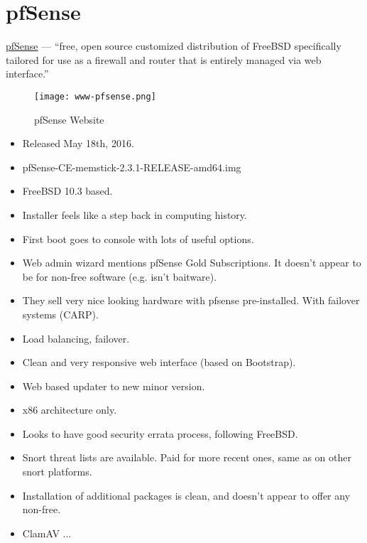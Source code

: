 \section{pfSense}
 \href{https://www.pfsense.org/}{pfSense} --- ``free, open source customized distribution of FreeBSD specifically tailored for use as a firewall and router that is entirely managed via web interface.''

\begin{figure}[h!]
\texttt{[image: www-pfsense.png]}
 \caption{pfSense Website}
 \label{fig:www-pfsense}
\end{figure}

\begin{itemize}
 \item Released May 18th, 2016.
 \item pfSense-CE-memstick-2.3.1-RELEASE-amd64.img
 \item FreeBSD 10.3 based.
 \item Installer feels like a step back in computing history.
 \item First boot goes to console with lots of useful options.
 \item Web admin wizard mentions pfSense Gold Subscriptions. It doesn't appear to be for non-free software (e.g. isn't baitware).
 \item They sell very nice looking hardware with pfsense pre-installed. With failover systems (CARP).
 \item Load balancing, failover.
 \item Clean and very responsive web interface (based on Bootstrap).
 \item Web based updater to new minor version.
 \item x86 architecture only.
 \item Looks to have good security errata process, following FreeBSD.
 \item Snort threat lists are available. Paid for more recent ones, same as on other snort platforms.
 \item Installation of additional packages is clean, and doesn't appear to offer any non-free.
 \item ClamAV ...
\end{itemize}

